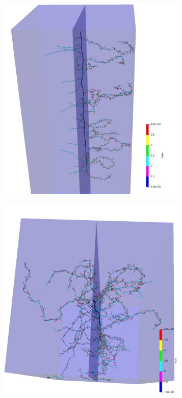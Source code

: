 \documentclass[a4paper]{article}
\begin{document}
\begin{figure}
\begin{subfigure}[c]{0.3\textwidth}
\includegraphics[width=0.99\textwidth]{example4b1.png}
 \label{fig:elongation}
\end{subfigure}
\begin{subfigure}[c]{0.3\textwidth}
\includegraphics[width=0.99\textwidth]{example4b2.png}

\end{subfigure}
\end{figure}
\end{document}
